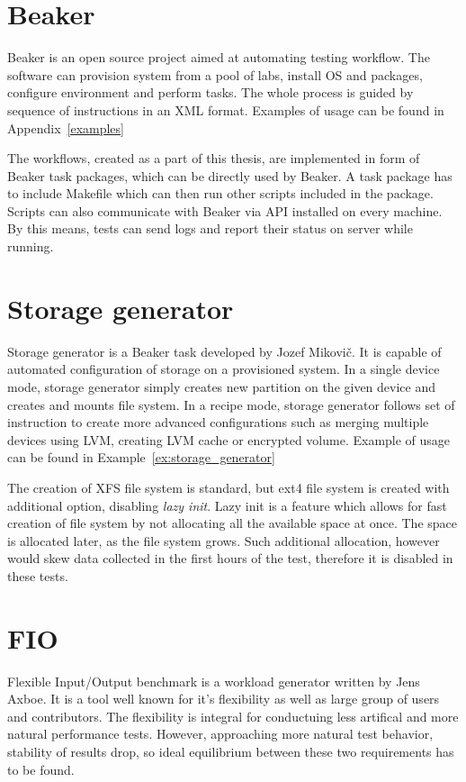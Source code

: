 \documentclass[
  color, %
  table, %
  lof,   %
  lot,   %
]{fithesis3}
\begin{document}
\section{Beaker}
Beaker is an open source project aimed at automating testing workflow. The software can provision system from a pool of labs, install OS and packages, configure environment and perform tasks. The whole process is guided by sequence of instructions in an XML format. Examples of usage can be found in Appendix~\ref{examples}

The workflows, created as a part of this thesis, are implemented in form of Beaker task packages, which can be directly used by Beaker. A task package has to include Makefile which can then run other scripts included in the package. Scripts can also communicate with Beaker via API installed on every machine. By this means, tests can send logs and report their status on server while running.

\section{Storage generator}
Storage generator is a Beaker task developed by Jozef Mikovič. It is capable of automated configuration of storage on a provisioned system. In a single device mode, storage generator simply creates new partition on the given device and creates and mounts file system. In a recipe mode, storage generator follows set of instruction to create more advanced configurations such as merging multiple devices using LVM, creating LVM cache or encrypted volume. Example of usage can be found in Example~\ref{ex:storage_generator}

The creation of XFS file system is standard, but ext4 file system is created with additional option, disabling \emph{lazy init}. Lazy init is a feature which allows for fast creation of file system by not allocating all the available space at once. The space is allocated later, as the file system grows. Such additional allocation, however would skew data collected in the first hours of the test, therefore it is disabled in these tests.

\section{FIO}
Flexible Input/Output benchmark is a workload generator written by Jens Axboe. It is a tool well known for it's flexibility as well as large group of users and contributors. The flexibility is integral for conductuing less artifical and more natural performance tests. However, approaching more natural test behavior, stability of results drop, so ideal equilibrium between these two requirements has to be found.
\end{document}
